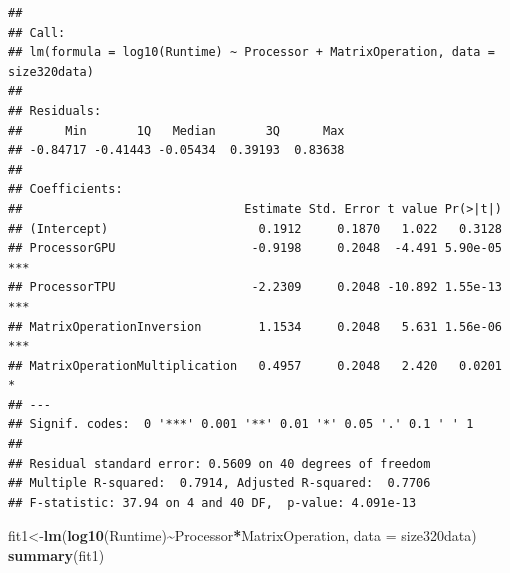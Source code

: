 \documentclass[
]{article}
\newenvironment{Shaded}{\begin{snugshade}}{\end{snugshade}}
\newcommand{\DataTypeTok}[1]{\textcolor[rgb]{0.13,0.29,0.53}{#1}}
\newcommand{\KeywordTok}[1]{\textcolor[rgb]{0.13,0.29,0.53}{\textbf{#1}}}
\newcommand{\NormalTok}[1]{#1}
\newcommand{\OperatorTok}[1]{\textcolor[rgb]{0.81,0.36,0.00}{\textbf{#1}}}
\begin{document}
\begin{verbatim}
## 
## Call:
## lm(formula = log10(Runtime) ~ Processor + MatrixOperation, data = size320data)
## 
## Residuals:
##      Min       1Q   Median       3Q      Max 
## -0.84717 -0.41443 -0.05434  0.39193  0.83638 
## 
## Coefficients:
##                               Estimate Std. Error t value Pr(>|t|)    
## (Intercept)                     0.1912     0.1870   1.022   0.3128    
## ProcessorGPU                   -0.9198     0.2048  -4.491 5.90e-05 ***
## ProcessorTPU                   -2.2309     0.2048 -10.892 1.55e-13 ***
## MatrixOperationInversion        1.1534     0.2048   5.631 1.56e-06 ***
## MatrixOperationMultiplication   0.4957     0.2048   2.420   0.0201 *  
## ---
## Signif. codes:  0 '***' 0.001 '**' 0.01 '*' 0.05 '.' 0.1 ' ' 1
## 
## Residual standard error: 0.5609 on 40 degrees of freedom
## Multiple R-squared:  0.7914, Adjusted R-squared:  0.7706 
## F-statistic: 37.94 on 4 and 40 DF,  p-value: 4.091e-13
\end{verbatim}

\begin{Shaded}
\begin{Highlighting}[]
\NormalTok{fit1\textless{}{-}}\KeywordTok{lm}\NormalTok{(}\KeywordTok{log10}\NormalTok{(Runtime)}\OperatorTok{\textasciitilde{}}\NormalTok{Processor}\OperatorTok{*}\NormalTok{MatrixOperation, }\DataTypeTok{data =}\NormalTok{ size320data)}
\KeywordTok{summary}\NormalTok{(fit1)}
\end{Highlighting}
\end{Shaded}
\end{document}
